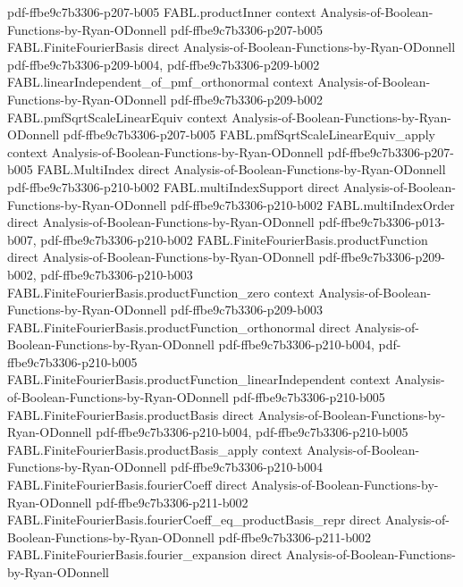 \begin{theorem}
  {pdf-ffbe9c7b3306-p207-b005}
\proofstep
  {FABL.productInner}
  {context}
  {Analysis-of-Boolean-Functions-by-Ryan-ODonnell}
  {pdf-ffbe9c7b3306-p207-b005}
\proofstep
  {FABL.FiniteFourierBasis}
  {direct}
  {Analysis-of-Boolean-Functions-by-Ryan-ODonnell}
  {pdf-ffbe9c7b3306-p209-b004,
    pdf-ffbe9c7b3306-p209-b002}
\proofstep
  {FABL.linearIndependent_of_pmf_orthonormal}
  {context}
  {Analysis-of-Boolean-Functions-by-Ryan-ODonnell}
  {pdf-ffbe9c7b3306-p209-b002}
\proofstep
  {FABL.pmfSqrtScaleLinearEquiv}
  {context}
  {Analysis-of-Boolean-Functions-by-Ryan-ODonnell}
  {pdf-ffbe9c7b3306-p207-b005}
\proofstep
  {FABL.pmfSqrtScaleLinearEquiv_apply}
  {context}
  {Analysis-of-Boolean-Functions-by-Ryan-ODonnell}
  {pdf-ffbe9c7b3306-p207-b005}
\proofstep
  {FABL.MultiIndex}
  {direct}
  {Analysis-of-Boolean-Functions-by-Ryan-ODonnell}
  {pdf-ffbe9c7b3306-p210-b002}
\proofstep
  {FABL.multiIndexSupport}
  {direct}
  {Analysis-of-Boolean-Functions-by-Ryan-ODonnell}
  {pdf-ffbe9c7b3306-p210-b002}
\proofstep
  {FABL.multiIndexOrder}
  {direct}
  {Analysis-of-Boolean-Functions-by-Ryan-ODonnell}
  {pdf-ffbe9c7b3306-p013-b007,
    pdf-ffbe9c7b3306-p210-b002}
\proofstep
  {FABL.FiniteFourierBasis.productFunction}
  {direct}
  {Analysis-of-Boolean-Functions-by-Ryan-ODonnell}
  {pdf-ffbe9c7b3306-p209-b002,
    pdf-ffbe9c7b3306-p210-b003}
\proofstep
  {FABL.FiniteFourierBasis.productFunction_zero}
  {context}
  {Analysis-of-Boolean-Functions-by-Ryan-ODonnell}
  {pdf-ffbe9c7b3306-p209-b003}
\proofstep
  {FABL.FiniteFourierBasis.productFunction_orthonormal}
  {direct}
  {Analysis-of-Boolean-Functions-by-Ryan-ODonnell}
  {pdf-ffbe9c7b3306-p210-b004,
    pdf-ffbe9c7b3306-p210-b005}
\proofstep
  {FABL.FiniteFourierBasis.productFunction_linearIndependent}
  {context}
  {Analysis-of-Boolean-Functions-by-Ryan-ODonnell}
  {pdf-ffbe9c7b3306-p210-b005}
\proofstep
  {FABL.FiniteFourierBasis.productBasis}
  {direct}
  {Analysis-of-Boolean-Functions-by-Ryan-ODonnell}
  {pdf-ffbe9c7b3306-p210-b004,
    pdf-ffbe9c7b3306-p210-b005}
\proofstep
  {FABL.FiniteFourierBasis.productBasis_apply}
  {context}
  {Analysis-of-Boolean-Functions-by-Ryan-ODonnell}
  {pdf-ffbe9c7b3306-p210-b004}
\proofstep
  {FABL.FiniteFourierBasis.fourierCoeff}
  {direct}
  {Analysis-of-Boolean-Functions-by-Ryan-ODonnell}
  {pdf-ffbe9c7b3306-p211-b002}
\proofstep
  {FABL.FiniteFourierBasis.fourierCoeff_eq_productBasis_repr}
  {direct}
  {Analysis-of-Boolean-Functions-by-Ryan-ODonnell}
  {pdf-ffbe9c7b3306-p211-b002}
\proofstep
  {FABL.FiniteFourierBasis.fourier_expansion}
  {direct}
  {Analysis-of-Boolean-Functions-by-Ryan-ODonnell}

\end{theorem}
